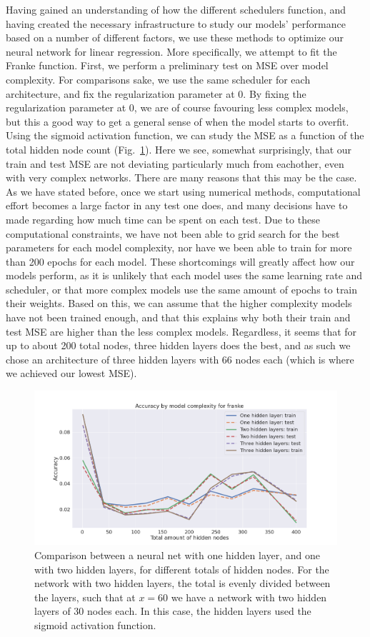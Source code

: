 \documentclass[onecolumn,10pt,cleanfoot]{asme2ej}
\begin{document}
Having gained an understanding of how the different schedulers function, and having created the necessary infrastructure to study our models' performance based on a number of different factors, we use these methods to optimize our neural network for linear regression. More specifically, we attempt to fit the Franke function. First, we perform a preliminary test on MSE over model complexity. For comparisons sake, we use the same scheduler for each architecture, and fix the regularization parameter at 0. By fixing the regularization parameter at 0, we are of course favouring less complex models, but this a good way to get a general sense of when the model starts to overfit. Using the sigmoid activation function, we can study the MSE as a function of the total hidden node count (Fig.~\ref{msebymodelfranke}). Here we see, somewhat surprisingly, that our train and test MSE are not deviating particularly much from eachother, even with very complex networks. There are many reasons that this may be the case. As we have stated before, once we start using numerical methods, computational effort becomes a large factor in any test one does, and many decisions have to made regarding how much time can be spent on each test. Due to these computational constraints, we have not been able to grid search for the best parameters for each model complexity, nor have we been able to train for more than 200 epochs for each model. These shortcomings will greatly affect how our models perform, as it is unlikely that each model uses the same learning rate and scheduler, or that more complex models use the same amount of epochs to train their weights. Based on this, we can assume that the higher complexity models have not been trained enough, and that this explains why both their train and test MSE are higher than the less complex models. Regardless, it seems that for up to about 200 total nodes, three hidden layers does the best, and as such we chose an architecture of three hidden layers with 66 nodes each (which is where we achieved our lowest MSE).

\begin{figure}[h]
\centerline{\includegraphics[width=6in]{figure/msebymodelfranke.png}}
\caption{Comparison between a neural net with one hidden layer, and one with two hidden layers, for different totals of hidden nodes. For the network with two hidden layers, the total is evenly divided between the layers, such that at $x = 60$ we have a network with two hidden layers of 30 nodes each. In this case, the hidden layers used the sigmoid activation function.}
\label{msebymodelfranke}
\end{figure}
\end{document}

